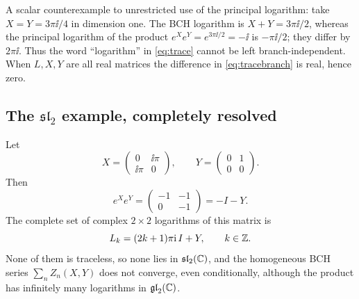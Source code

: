 A scalar counterexample to unrestricted use of the principal logarithm:
take $X=Y=3\pi\ii/4$ in dimension one. The BCH logarithm is $X+Y=3\pi\ii/2$,
whereas the principal logarithm of the product $e^Xe^Y=e^{3\pi\ii/2}=-\ii$
is $-\pi\ii/2$; they differ by $2\pi\ii$. Thus the word ``logarithm'' in
\eqref{eq:trace} cannot be left branch-independent. When $L,X,Y$ are all
real matrices the difference in \eqref{eq:tracebranch} is real, hence zero.

\subsection{The \texorpdfstring{$\mathfrak{sl}_2$}{sl2} example, completely resolved}
\begin{theorem}\label{thm:sl2}
Let
\begin{equation}\label{eq:sl2XY}
 X=\begin{pmatrix}0&\ii\pi\\\ii\pi&0\end{pmatrix},\qquad
 Y=\begin{pmatrix}0&1\\0&0\end{pmatrix}.
\end{equation}
Then
\begin{equation}\label{eq:sl2product}
 e^Xe^Y=\begin{pmatrix}-1&-1\\0&-1\end{pmatrix}=-I-Y.
\end{equation}
The complete set of complex $2\times2$ logarithms of this matrix is
\begin{equation}\label{eq:sl2logs}
 L_k=(2k+1)\pi\mathrm{i}\,I+Y,\qquad k\in\mathbb{Z}.
\end{equation}
None of them is traceless, so none lies in $\mathfrak{sl}_2(\mathbb{C})$, and the
homogeneous BCH series $\sum_nZ_n(X,Y)$ does not converge, even
conditionally, although the product has infinitely many logarithms in
$\mathfrak{gl}_2(\mathbb{C})$.
\end{theorem}
